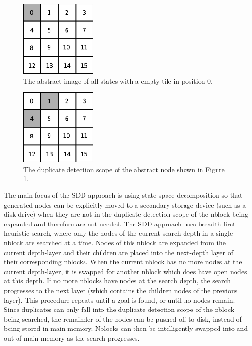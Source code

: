 \documentclass{article} \usepackage{aaai} \usepackage{graphicx}
\begin{document}
\begin{figure}[t]
\begin{center}
\includegraphics[width=1.5in]{images/tile-abstraction.eps}
\caption{The abstract image of all states with a empty tile in
  position 0.}
\label{fig:tile-abstraction}
\end{center}
\end{figure}

\begin{figure}[t]
\begin{center}
\includegraphics[width=1.5in]{images/duplicate-detection-scope.eps}
\caption{The duplicate detection scope of the abstract node shown in
  Figure \ref{fig:tile-abstraction}.}
\label{fig:duplicate-detection-scope}
\end{center}
\end{figure}

The main focus of the SDD approach is using state space decomposition
so that generated nodes can be explicitly moved to a secondary storage
device (such as a disk drive) when they are not in the duplicate
detection scope of the nblock being expanded and therefore are not
needed.  The SDD approach uses breadth-first heuristic search, where
only the nodes of the current search depth in a single nblock are
searched at a time.  Nodes of this nblock are expanded from the
current depth-layer and their children are placed into the next-depth
layer of their corresponding nblocks.  When the current nblock has no
more nodes at the current depth-layer, it is swapped for another
nblock which does have open nodes at this depth.  If no more nblocks
have nodes at the search depth, the search progresses to the next
layer (which contains the children nodes of the previous layer).  This
procedure repeats until a goal is found, or until no nodes
remain. Since duplicates can only fall into the duplicate detection
scope of the nblock being searched, the remainder of the nodes can be
pushed off to disk, instead of being stored in main-memory.  Nblocks
can then be intelligently swapped into and out of main-memory as the
search progresses.
\end{document}
